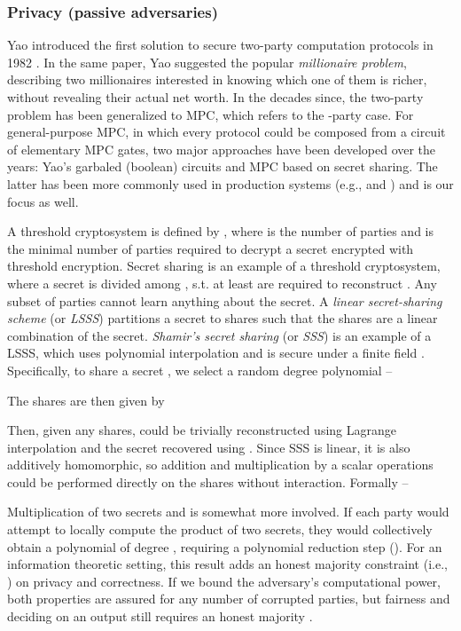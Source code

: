 \documentclass{article} \usepackage{nips13submit_e,times}
\begin{document}
\subsubsection{Privacy (passive adversaries)}

Yao introduced the first solution to secure two-party computation protocols in 1982 \cite{yao82}. In the same paper, Yao suggested the popular \textit{millionaire problem}, describing two millionaires interested in knowing which one of them is richer, without revealing their actual net worth. In the decades since, the two-party problem has been generalized to MPC, which refers to the -party case. For general-purpose MPC, in which every protocol could be composed from a circuit of elementary MPC gates, two major approaches have been developed over the years: Yao's garbaled (boolean) circuits \cite{fairplaymp} and MPC based on secret sharing. The latter has been more commonly used in production systems (e.g., \cite{sharemind} and \cite{viff}) and is our focus as well.

A threshold cryptosystem is defined by , where  is the number of parties and  is the minimal number of parties required to decrypt a secret encrypted with threshold encryption. Secret sharing is an example of a threshold cryptosystem, where a secret  is divided among , s.t. at least  are required to reconstruct . Any subset of  parties cannot learn anything about the secret. A \textit{linear secret-sharing scheme} (or \textit{LSSS}) partitions a secret to shares such that the shares are a linear combination of the secret. \textit{Shamir's secret sharing} (or \textit{SSS}) is an example of a LSSS, which uses polynomial interpolation and is secure under a finite field  \cite{shamir}. Specifically, to share a secret , we select a random  degree polynomial  --



The shares are then given by 


Then, given any  shares,  could be trivially reconstructed using Lagrange interpolation and the secret  recovered using . Since SSS is linear, it is also additively homomorphic, so addition and multiplication by a scalar operations could be performed directly on the shares without interaction. Formally --



Multiplication of two secrets  and  is somewhat more involved. If each party would attempt to locally compute the product of two secrets, they would collectively obtain a polynomial of degree , requiring a polynomial reduction step (). For an information theoretic setting, this result adds an honest majority constraint (i.e., ) on privacy and correctness. If we bound the adversary's computational power, both properties are assured for any number of corrupted parties, but fairness and deciding on an output still requires an honest majority \cite{GBW88}.
\end{document}
